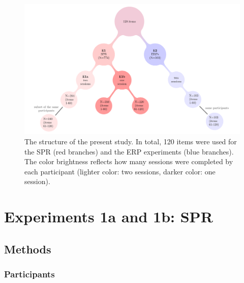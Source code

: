 \documentclass[a4paper, man, floatsintext]{apa7}
\begin{document}
\begin{figure}[H]
    \caption{The structure of the present study. In total, 120 items were used for the SPR (red branches) and the ERP experiments (blue branches). The color brightness reflects how many sessions were completed by each participant (lighter color: two sessions, darker color: one session).}
    \label{fig:project_str}
    \centering
    \includegraphics[width=\textwidth]{images/pandora_project_structure_figure.pdf}
\end{figure}

\label{statement}


\section{Experiments 1a and 1b: SPR}

\subsection{Methods}
\subsubsection{Participants}
\end{document}
